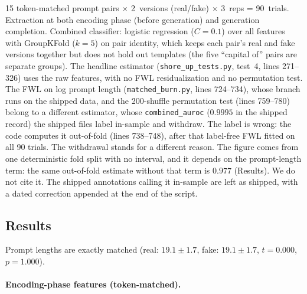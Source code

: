 \documentclass[11pt,a4paper]{article}
\begin{document}
15 token-matched prompt pairs $\times$ 2~versions (real/fake) $\times$
3~reps = 90~trials. Extraction at both encoding phase (before generation)
and generation completion. Combined classifier: logistic regression
($C{=}0.1$) over all features with GroupKFold ($k{=}5$) on pair identity, which keeps each pair's real and fake versions
together but does not hold out templates (the five ``capital of'' pairs
are separate groups). The headline estimator (\texttt{shore\_up\_tests.py},
test~4, lines 271--326) uses the raw features, with no FWL
residualization and no permutation test. The FWL on log prompt length
(\texttt{matched\_burn.py}, lines 724--734), whose branch runs on the
shipped data, and the 200-shuffle permutation test (lines 759--780)
belong to a different estimator, whose \texttt{combined\_auroc}
($0.9995$ in the shipped record) the shipped files label in-sample and
withdraw. The label is wrong: the code computes it out-of-fold
(lines 738--748), after that label-free FWL fitted on all 90 trials. The
withdrawal stands for a different reason. The figure comes from one
deterministic fold split with no interval, and it depends on the
prompt-length term: the same out-of-fold estimate without that term is
$0.977$ (Results). We do not cite it. The shipped annotations calling it in-sample are left as shipped, with a dated correction appended at the end of the script.

\subsection{Results}

Prompt lengths are exactly matched (real: $19.1 \pm 1.7$, fake:
$19.1 \pm 1.7$, $t{=}0.000$, $p{=}1.000$).

\paragraph{Encoding-phase features (token-matched).}
\end{document}
